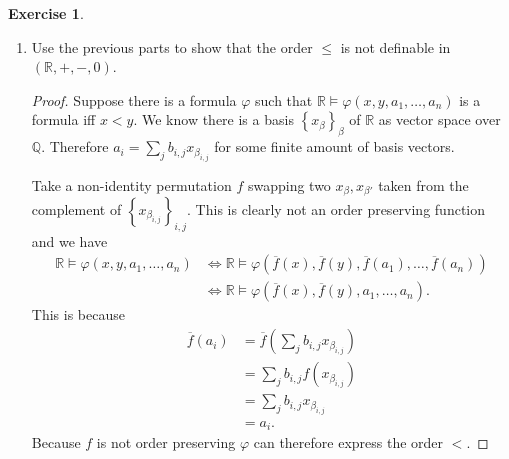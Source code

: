 \documentclass{article}
\newcommand{\Q}{\mathbb{Q}}
\newcommand{\R}{\mathbb{R}}
\newcommand{\set}[1]{\left\{#1\right\}}
\theoremstyle{definition}
\newtheorem{question}{Exercise}
\begin{document}
\begin{question}
\begin{enumerate}[(1)]
\begin{proof}
                  The inverse permutation \(f^{-1}\) induces a map
                  \(\overline{f^{-1}}:V\to V\) which has that both
                  \(\overline{f^{-1}}\circ\overline{f}\) and
                  \(\overline{f}\circ\overline{f^{-1}}\) are the identity on
                  \(B\) and therefore on the entirety of \(V\) because \(V\) is
                  generated by \(B\). This shows that \(\overline{f}\) has an
                  inverse and is an isomorphism.
              \end{proof}

        \item Use the previous parts to show that the order \(\leq\) is not
              definable in \((\R,+,-,0)\).

              \begin{proof}
                  Suppose there is a formula \(\varphi\) such that
                  \(\R\models\varphi(x,y,a_{1},\ldots,a_{n})\) is a formula iff
                  \(x<y\). We know there is a basis \(\set{x_{\beta}}_{\beta}\)
                  of \(\R\) as vector space over \(\Q\). Therefore
                  \(a_{i}=\sum_{j}b_{i,j}x_{\beta_{i,j}}\) for some finite amount
                  of basis vectors.

                  Take a non-identity permutation \(f\) swapping two
                  \(x_{\beta},x_{\beta'}\) taken from the complement of
                  \(\set{x_{\beta_{i,j}}}_{i,j}\). This is clearly not an order
                  preserving function and we have
                  \begin{align*}
                      \R\models\varphi(x,y,a_{1},\ldots,a_{n}) & \Leftrightarrow\R\models\varphi(\overline{f}(x),\overline{f}(y),\overline{f}(a_{1}),\ldots,\overline{f}(a_{n})) \\
                                                               & \Leftrightarrow\R\models\varphi(\overline{f}(x),\overline{f}(y),a_{1},\ldots,a_{n}).
                  \end{align*}
                  This is because
                  \begin{align*}
                      \overline{f}(a_{i}) & =\overline{f}\left(\sum_{j}b_{i,j}x_{\beta_{i,j}}\right) \\
                                          & =\sum_{j}b_{i,j}f(x_{\beta_{i,j}})                       \\
                                          & =\sum_{j}b_{i,j}x_{\beta_{i,j}}                          \\
                                          & =a_{i}.
                  \end{align*}
                  Because \(f\) is not order preserving \(\varphi\) can
                  therefore express the order \(<\).
              \end{proof}
    \end{enumerate}
\end{question}
\end{document}
